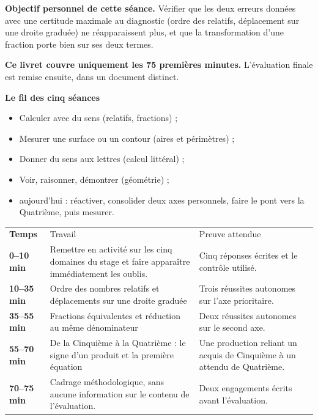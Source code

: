 \documentclass[10pt,a4paper]{article}
\begin{document}
\begin{goalbox}
\textbf{Objectif personnel de cette séance.} Vérifier que les deux erreurs données avec une certitude maximale au diagnostic (ordre des relatifs, déplacement sur une droite graduée) ne réapparaissent plus, et que la transformation d'une fraction porte bien sur ses deux termes.
\par\medskip
\textbf{Ce livret couvre uniquement les 75 premières minutes.} L'évaluation finale est remise ensuite, dans un document distinct.
\end{goalbox}
\begin{methodbox}
\textbf{Le fil des cinq séances}
\begin{itemize}[leftmargin=13mm,labelsep=3mm,itemsep=1.5pt]
\item[\textbf{\color{Navy}S1}] Calculer avec du sens (relatifs, fractions) ;
\item[\textbf{\color{Navy}S2}] Mesurer une surface ou un contour (aires et périmètres) ;
\item[\textbf{\color{Navy}S3}] Donner du sens aux lettres (calcul littéral) ;
\item[\textbf{\color{Navy}S4}] Voir, raisonner, démontrer (géométrie) ;
\item[\textbf{\color{Navy}S5}] aujourd'hui : réactiver, consolider deux axes personnels, faire le pont vers la Quatrième, puis mesurer.
\end{itemize}
\end{methodbox}
\par\noindent\begin{tabularx}{\linewidth}{>{\bfseries}p{20mm} X X}
\rowcolor{Navy}\color{white}Temps & \color{white}Travail & \color{white}Preuve attendue \\
0--10 min & Remettre en activité sur les cinq domaines du stage et faire apparaître immédiatement les oublis. & Cinq réponses écrites et le contrôle utilisé. \\
10--35 min & Ordre des nombres relatifs et déplacements sur une droite graduée & Trois réussites autonomes sur l'axe prioritaire. \\
35--55 min & Fractions équivalentes et réduction au même dénominateur & Deux réussites autonomes sur le second axe. \\
55--70 min & De la Cinquième à la Quatrième : le signe d'un produit et la première équation & Une production reliant un acquis de Cinquième à un attendu de Quatrième. \\
70--75 min & Cadrage méthodologique, sans aucune information sur le contenu de l'évaluation. & Deux engagements écrits avant l'évaluation. \\
\end{tabularx}
\end{document}
